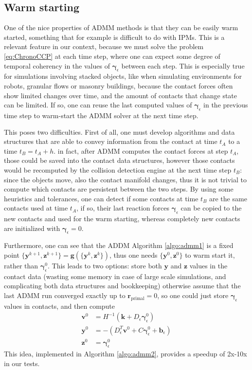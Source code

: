\documentclass[AMA,STIX1COL]{WileyNJD-v2}
\newcommand{\vect}[1]{\bm{#1}}
\begin{document}
\subsection{Warm starting}

One of the nice properties of ADMM methods is that they can be easily warm started, something that for example is difficult to do with IPMs. 
This is a relevant feature in our context, because we must solve the problem \eqref{eq:ChronoCCP} at each time step, where one can expect some degree of temporal coherency in the values of $\vect{\gamma}_\epsilon$ between each step. This is especially true for simulations involving stacked objects, like when simulating environments for robots, granular flows or masonry buildings, because the contact forces often show limited changes over time, and the amount of contacts that change state can be limited. If so, one can reuse the last computed values of $\vect{\gamma}_\epsilon$ in the previous time step to warm-start the ADMM solver at the next time step.

This poses two difficulties. First of all, one must develop algorithms and data structures that are able to convey information from the contact at time $t_A$ to a time $t_B = t_A+h$. in fact, after ADMM computes the contact forces at step $t_A$, those could be saved into the contact data structures, however those contacts would be recomputed by the collision detection engine at the next time step $t_B$: since the objects move, also the contact manifold changes, thus it is not trivial to compute which contacts are persistent between the two steps. By using some heuristics and tolerances, one can detect if some contacts at time $t_B$ are the same contacts used at time $t_A$, if so, their last reaction forces $\vect{\gamma}_\epsilon$ can be copied to the new contacts and used for the warm starting, whereas completely new contacts are initialized with $\vect{\gamma}_\epsilon = 0$. 

Furthermore, one can see that the ADDM Algorithm \ref{algo:admm1} is a fixed point 
$\{\vect{y}^{k+1},\vect{z}^{k+1}\} = \vect{g} \left(\{\vect{y}^k,\vect{z}^k\}\right)$, thus one needs $\{\vect{y}^0,\vect{z}^0\}$ to warm start it, rather than $\vect{\gamma}_\epsilon^0$. This leads to two options: store both $\vect{y}$ and $\vect{z}$ values in the contact data (wasting some memory in case of large scale simulations, and complicating both data structures and bookkeeping) otherwise assume that the last ADMM run converged exactly up to $\vect{r}_{\text{primal}}=0$, so one could just store $\vect{\gamma}_\epsilon$ values in contacts, and then compute
%
\begin{align}
\vect{v}^0 &= H^{-1}( \vect{k} + D_\epsilon \vect{\gamma}_\epsilon^0) \nonumber \\
\vect{y}^0 &= - (D_\epsilon^T \vect{v}^0 + C \vect{\gamma}_\epsilon^0 + \vect{b}_\epsilon)  \nonumber \\
\vect{z}^0 &= \vect{\gamma}_\epsilon^0 \nonumber
\end{align}
This idea, implemented in Algorithm \ref{algo:admm2}, provides a speedup of 2x-10x in our tests.
\end{document}

